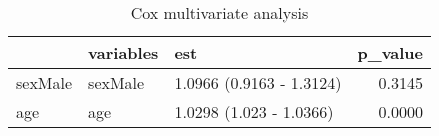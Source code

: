 \begin{table}

\caption{Cox multivariate analysis}
\centering
\begin{tabular}[t]{l|l|l|r}
\hline
  & variables & est & p\_value\\
\hline
sexMale & sexMale & 1.0966 (0.9163 - 1.3124) & 0.3145\\
\hline
age & age & 1.0298 (1.023 - 1.0366) & 0.0000\\
\hline
\end{tabular}
\end{table}
